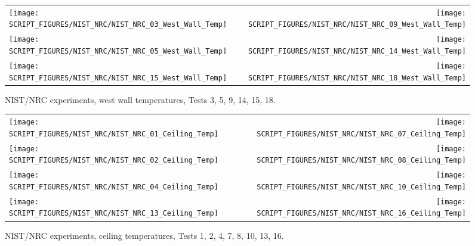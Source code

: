 \begin{figure}[p]
\begin{tabular*}{\textwidth}{l@{\extracolsep{\fill}}r}
\texttt{[image: SCRIPT\_FIGURES/NIST\_NRC/NIST\_NRC\_03\_West\_Wall\_Temp]} &
\texttt{[image: SCRIPT\_FIGURES/NIST\_NRC/NIST\_NRC\_09\_West\_Wall\_Temp]} \\
\texttt{[image: SCRIPT\_FIGURES/NIST\_NRC/NIST\_NRC\_05\_West\_Wall\_Temp]} &
\texttt{[image: SCRIPT\_FIGURES/NIST\_NRC/NIST\_NRC\_14\_West\_Wall\_Temp]} \\
\texttt{[image: SCRIPT\_FIGURES/NIST\_NRC/NIST\_NRC\_15\_West\_Wall\_Temp]} &
\texttt{[image: SCRIPT\_FIGURES/NIST\_NRC/NIST\_NRC\_18\_West\_Wall\_Temp]}
\end{tabular*}
\caption[NIST/NRC experiments, west wall temperatures, Tests 3, 5, 9, 14, 15, 18]{NIST/NRC experiments, west wall temperatures, Tests 3, 5, 9, 14, 15, 18.}
\label{NIST_NRC_West_Wall_Temp_Open}
\end{figure}

\begin{figure}[p]
\begin{tabular*}{\textwidth}{l@{\extracolsep{\fill}}r}
\texttt{[image: SCRIPT\_FIGURES/NIST\_NRC/NIST\_NRC\_01\_Ceiling\_Temp]} &
\texttt{[image: SCRIPT\_FIGURES/NIST\_NRC/NIST\_NRC\_07\_Ceiling\_Temp]} \\
\texttt{[image: SCRIPT\_FIGURES/NIST\_NRC/NIST\_NRC\_02\_Ceiling\_Temp]} &
\texttt{[image: SCRIPT\_FIGURES/NIST\_NRC/NIST\_NRC\_08\_Ceiling\_Temp]} \\
\texttt{[image: SCRIPT\_FIGURES/NIST\_NRC/NIST\_NRC\_04\_Ceiling\_Temp]} &
\texttt{[image: SCRIPT\_FIGURES/NIST\_NRC/NIST\_NRC\_10\_Ceiling\_Temp]} \\
\texttt{[image: SCRIPT\_FIGURES/NIST\_NRC/NIST\_NRC\_13\_Ceiling\_Temp]} &
\texttt{[image: SCRIPT\_FIGURES/NIST\_NRC/NIST\_NRC\_16\_Ceiling\_Temp]}
\end{tabular*}
\caption[NIST/NRC experiments, ceiling temperatures, Tests 1, 2, 4, 7, 8, 10, 13, 16]{NIST/NRC experiments, ceiling temperatures, Tests 1, 2, 4, 7, 8, 10, 13, 16.}
\label{NIST_NRC_Ceiling_Temp_Closed}
\end{figure}

